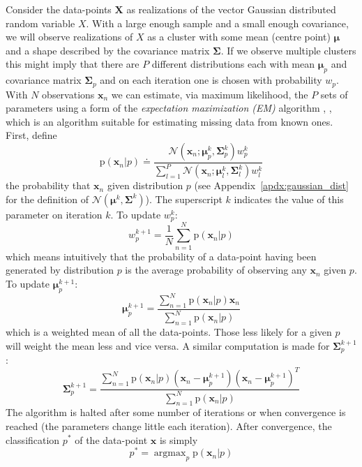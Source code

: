 \documentclass[letterpaper,12pt]{report}
\newcommand\ddfrac[2]{\frac{\displaystyle #1}{\displaystyle #2}}
\DeclareMathOperator{\argmax}{argmax}
\begin{document}
Consider the data-points $\boldsymbol{X}$ as realizations of the vector Gaussian
distributed random variable
$X$. With a large enough sample and a small enough covariance, we will observe
realizations of $X$ as a cluster with some mean (centre point) $\boldsymbol{\mu}$ and a shape
described by the covariance matrix $\boldsymbol{\Sigma}$. If we observe multiple
clusters this might imply that there are $P$ different distributions each with
mean $\boldsymbol{\mu}_p$ and covariance matrix $\boldsymbol{\Sigma}_p$ and on each
iteration one is chosen with probability $w_p$. With $N$ observations
$\boldsymbol{x}_{n}$ we can estimate, via maximum likelihood, the $P$ sets of
parameters using a form of the \textit{expectation maximization (EM)} algorithm
\cite{moon1996expectation}, \cite{dempster1977maximum}, which is an algorithm
suitable for estimating missing data from known ones. First, define
\[
    \mathrm{p} \left( \boldsymbol{x}_{n} | p \right)
    \doteq
    \ddfrac{
        \mathcal{N} \left( \boldsymbol{x}_{n}; \boldsymbol{\mu}^{k}_{p} ,
        \boldsymbol{\Sigma}^{k}_{p} \right) w^{k}_{p}
    }{
        \sum_{l=1}^{P}
        \mathcal{N} \left( \boldsymbol{x}_{n}; \boldsymbol{\mu}^{k}_{l} ,
        \boldsymbol{\Sigma}^{k}_{l} \right) w^{k}_{l}
    }
\]
the probability that $\boldsymbol{x}_n$ given distribution $p$ (see
Appendix~\ref{apdx:gaussian_dist} for the definition of $\mathcal{N} \left(
\boldsymbol{\mu}^{k} , \boldsymbol{\Sigma}^{k} \right)$). The superscript $k$
indicates the value of this parameter on iteration $k$. To update $w^{k}_p$:
\[
    w^{k+1}_p = \frac{1}{N} \sum_{n=1}^{N} \mathrm{p} \left( \boldsymbol{x}_n |
    p \right)
\]
which means intuitively that the probability of a data-point having been
generated by distribution $p$ is the average probability of observing any
$\boldsymbol{x}_n$ given $p$. To update $\boldsymbol{\mu}^{k+1}_p$:
\[
    \boldsymbol{\mu}^{k+1}_p
    =
    \ddfrac{\sum_{n=1}^{N} \mathrm{p} \left( \boldsymbol{x}_n |
    p \right) \boldsymbol{x}_n }{\sum_{n=1}^{N} \mathrm{p} \left( \boldsymbol{x}_n |
    p \right)}
\]
which is a weighted mean of all the data-points. Those less likely for a
given $p$ will weight the mean less and vice versa. A similar computation is
made for $\boldsymbol{\Sigma}^{k+1}_p$:
\[
    \boldsymbol{\Sigma}^{k+1}_p
    =
    \ddfrac{\sum_{n=1}^{N} \mathrm{p} \left( \boldsymbol{x}_n | p \right)
        \left( \boldsymbol{x}_n - \boldsymbol{\mu}^{k+1}_p \right) \left(
        \boldsymbol{x}_n - \boldsymbol{\mu}^{k+1}_p \right)^{T}
    }{
        \sum_{n=1}^{N} \mathrm{p} \left( \boldsymbol{x}_n | p \right)
    }
\]
The algorithm is halted after some number of iterations or when convergence is
reached (the parameters change little each iteration). After convergence, the
classification $p^{\ast}$ of the data-point $\boldsymbol{x}$ is simply
\[
    p^{\ast} = \argmax_{p} \mathrm{p} \left( \boldsymbol{x}_n | p \right)
\]
\end{document}

